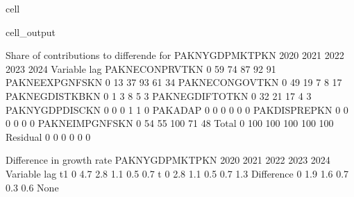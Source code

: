 \documentclass[letterpaper,10pt,english]{jupyterBook}
\begin{document}
\begin{sphinxuseclass}{cell}
\begin{sphinxVerbatimOutput}
\begin{sphinxuseclass}{cell_output}
\begin{sphinxVerbatim}[commandchars=\\\{\}]
 Share of contributions to differende for  PAKNYGDPMKTPKN
                          2020        2021        2022        2023        2024
Variable       lag                                                            
PAKNECONPRVTKN 0           59\PYGZpc{}         74\PYGZpc{}         87\PYGZpc{}         92\PYGZpc{}         91\PYGZpc{}
PAKNEEXPGNFSKN 0           13\PYGZpc{}         37\PYGZpc{}         93\PYGZpc{}         61\PYGZpc{}         34\PYGZpc{}
PAKNECONGOVTKN 0           49\PYGZpc{}         19\PYGZpc{}         \PYGZhy{}7\PYGZpc{}          8\PYGZpc{}         17\PYGZpc{}
PAKNEGDISTKBKN 0            1\PYGZpc{}          3\PYGZpc{}          8\PYGZpc{}          5\PYGZpc{}          3\PYGZpc{}
PAKNEGDIFTOTKN 0           32\PYGZpc{}         21\PYGZpc{}         17\PYGZpc{}          4\PYGZpc{}          3\PYGZpc{}
PAKNYGDPDISCKN 0            0\PYGZpc{}          0\PYGZpc{}          1\PYGZpc{}          1\PYGZpc{}          0\PYGZpc{}
PAKADAP        0           \PYGZhy{}0\PYGZpc{}         \PYGZhy{}0\PYGZpc{}         \PYGZhy{}0\PYGZpc{}         \PYGZhy{}0\PYGZpc{}         \PYGZhy{}0\PYGZpc{}
PAKDISPREPKN   0           \PYGZhy{}0\PYGZpc{}         \PYGZhy{}0\PYGZpc{}         \PYGZhy{}0\PYGZpc{}         \PYGZhy{}0\PYGZpc{}         \PYGZhy{}0\PYGZpc{}
PAKNEIMPGNFSKN 0          \PYGZhy{}54\PYGZpc{}        \PYGZhy{}55\PYGZpc{}       \PYGZhy{}100\PYGZpc{}        \PYGZhy{}71\PYGZpc{}        \PYGZhy{}48\PYGZpc{}
Total          0          100\PYGZpc{}        100\PYGZpc{}        100\PYGZpc{}        100\PYGZpc{}        100\PYGZpc{}
Residual       0           \PYGZhy{}0\PYGZpc{}         \PYGZhy{}0\PYGZpc{}         \PYGZhy{}0\PYGZpc{}         \PYGZhy{}0\PYGZpc{}         \PYGZhy{}0\PYGZpc{}

 Difference in growth rate PAKNYGDPMKTPKN
                      2020        2021        2022        2023        2024
Variable   lag                                                            
t\PYGZhy{}1        0          4.7\PYGZpc{}        2.8\PYGZpc{}        1.1\PYGZpc{}        0.5\PYGZpc{}        0.7\PYGZpc{}
t          0          2.8\PYGZpc{}        1.1\PYGZpc{}        0.5\PYGZpc{}        0.7\PYGZpc{}        1.3\PYGZpc{}
Difference 0         \PYGZhy{}1.9\PYGZpc{}       \PYGZhy{}1.6\PYGZpc{}       \PYGZhy{}0.7\PYGZpc{}        0.3\PYGZpc{}        0.6\PYGZpc{}
None


\end{sphinxVerbatim}
\end{sphinxuseclass}
\end{sphinxVerbatimOutput}
\end{sphinxuseclass}
\end{document}
